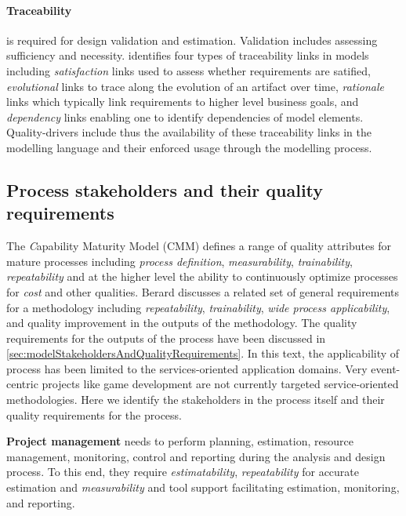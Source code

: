 \paragraph{Traceability} is required for design validation and estimation. Validation includes assessing sufficiency and necessity. \cite{ramesh_toward_2001} identifies four types of traceability links in models including \emph{satisfaction} links used to assess whether requirements are satified, \emph{evolutional} links to trace along the evolution of an artifact over time, \emph{rationale} links which typically link requirements to higher level business goals, and \emph{dependency} links enabling one to identify dependencies of model elements. Quality-drivers include thus the availability of these traceability links in the modelling language and their enforced usage through the modelling process.


\subsection{Process stakeholders and their quality requirements}

The {\emph Capability Maturity Model} (CMM) \cite{CMM} defines a range of quality attributes for mature processes including \emph{process definition}, \emph{measurability}, \emph{trainability}, \emph{repeatability} and at the higher level the ability to continuously optimize processes for \emph{cost} and other qualities. Berard\cite{berard_what_1995} discusses a related set of general requirements for a methodology including \emph{repeatability}, \emph{trainability}, \emph{wide process applicability}, and quality improvement in the outputs of the methodology. The quality requirements for the outputs of the process have been discussed in \ref{sec:modelStakeholdersAndQualityRequirements}. In this text, the applicability of process has been limited to the services-oriented application domains. Very event-centric projects like game development are not currently targeted service-oriented methodologies. Here we identify the stakeholders in the process itself and their quality requirements for the process. 

{\bf Project management} needs to perform planning, estimation, resource management, monitoring, control and reporting during the analysis and design process. To this end, they require \emph{estimatability}, \emph{repeatability} for accurate estimation and \emph{measurability} and tool support facilitating estimation, monitoring, and reporting.

